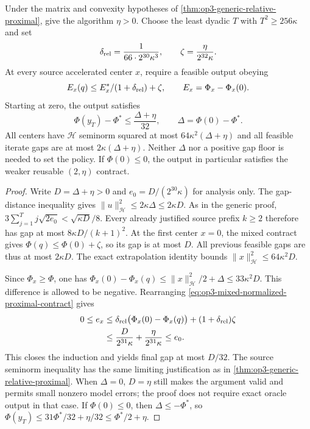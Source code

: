 \begin{theorem}
\label{thm:op3-mixed-proximal-accuracy}
Under the matrix and convexity hypotheses of
\cref{thm:op3-generic-relative-proximal}, give the algorithm $\eta>0$.
Choose the least dyadic $T$ with $T^2\geq256\kappa$ and set
\begin{equation}
 \delta_{\rm rel}=\frac1{66\cdot2^{30}\kappa^3},\qquad
 \zeta=\frac{\eta}{2^{32}\kappa}.
 \label{eq:op3-mixed-proximal-policy}
\end{equation}
At every source accelerated center $x$, require a feasible output obeying
\begin{equation}
 E_x(q)\leq E_x^*/(1+\delta_{\rm rel})+\zeta,
 \qquad E_x=\Phi_x-\Phi_x(0).
 \label{eq:op3-mixed-normalized-proximal-contract}
\end{equation}
Starting at zero, the output satisfies
\[
 \Phi(y_T)-\Phi^*\leq\frac{\Delta+\eta}{32},
 \qquad\Delta=\Phi(0)-\Phi^*.
\]
All centers have $\mathcal H$ seminorm squared at most
$64\kappa^2(\Delta+\eta)$ and all feasible iterate gaps are at most
$2\kappa(\Delta+\eta)$. Neither $\Delta$ nor a positive gap floor is
needed to set the policy. If $\Phi(0)\leq0$, the output in particular
satisfies the weaker reusable $(2,\eta)$ contract.
\end{theorem}
\begin{proof}
Write $D=\Delta+\eta>0$ and $e_0=D/(2^{30}\kappa)$ for analysis only.
The gap-distance inequality gives $\|u\|_{\mathcal H}^2\leq2\kappa\Delta
\leq2\kappa D$. As in the generic proof,
$3\sum_{j=1}^Tj\sqrt{2e_0}<\sqrt{\kappa D}/8$.
Every already justified source prefix $k\geq2$ therefore has gap at
most $8\kappa D/(k+1)^2$. At the first center $x=0$, the mixed
contract gives $\Phi(q)\leq\Phi(0)+\zeta$, so its gap is at most $D$.
All previous feasible gaps are thus at most $2\kappa D$. The exact
extrapolation identity bounds $\|x\|_{\mathcal H}^2\leq64\kappa^2D$.

Since $\Phi_x\geq\Phi$, one has
$\Phi_x(0)-\Phi_x(q)\leq\|x\|_{\mathcal H}^2/2+\Delta
\leq33\kappa^2D$. This difference is allowed to be negative.
Rearranging \eqref{eq:op3-mixed-normalized-proximal-contract} gives
\begin{align*}
 0\leq e_x&\leq\delta_{\rm rel}\bigl(\Phi_x(0)-\Phi_x(q)\bigr)
                +(1+\delta_{\rm rel})\zeta\\
 &\leq\frac{D}{2^{31}\kappa}+
          \frac{\eta}{2^{31}\kappa}\leq e_0.
\end{align*}
This closes the induction and yields final gap at most $D/32$.
The source seminorm inequality has the same limiting justification as
in \cref{thm:op3-generic-relative-proximal}. When $\Delta=0$, $D=\eta$
still makes the argument valid and permits small nonzero model errors;
the proof does not require exact oracle output in that case.
If $\Phi(0)\leq0$, then $\Delta\leq-\Phi^*$, so
$\Phi(y_T)\leq31\Phi^*/32+\eta/32\leq\Phi^*/2+\eta$.
\end{proof}

